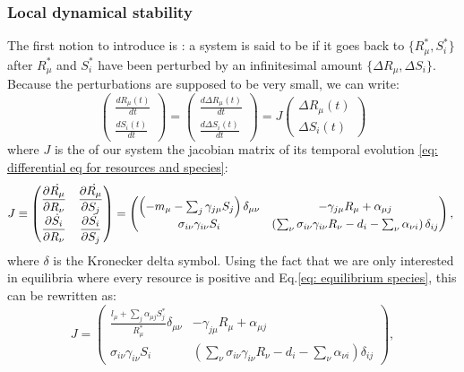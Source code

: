 \documentclass[12pt, titlepage]{report}
\begin{document}
\subsubsection{Local dynamical stability}
The first notion to introduce is : a system is said to be  if it goes back to  $\{ R^*_\mu, S^*_i \} $ after $R^*_\mu$ and $S^*_i$ have been perturbed by an infinitesimal amount $\{ \Delta R_\mu, \Delta S_i \}$.
Because the perturbations are supposed to be very small, we can write:
\begin{equation}
\begin{pmatrix}
\frac{dR_\mu(t)}{dt} \\
\frac{dS_i(t)}{dt}
\end{pmatrix}
=
\begin{pmatrix}
\frac{d\Delta R_\mu(t)}{dt} \\
\frac{d\Delta S_i(t)}{dt}
\end{pmatrix}
=
J
\begin{pmatrix}
\Delta R_\mu(t) \\
\Delta S_i(t)
\end{pmatrix}
\end{equation}
where $J$ is the  of our system \ie the jacobian matrix of its temporal evolution \eqref{eq: differential eq for resources and species}:
\begin{equation}
  J \defined
\begin{pmatrix}
  \partiald{\dot{R_\mu}}{R_\nu}& \partiald{\dot{R_\mu}}{S_j} \\
  \partiald{\dot{S_i}}{R_\nu} & \partiald{\dot{S_i}}{S_j}
\end{pmatrix}
=
\begin{pmatrix}
  \left(-m_\mu-\sum_j \gamma_{j\mu}S_j\right)\delta_{\mu\nu} & -\gamma_{j\mu}R_\mu+\alpha_{\mu j} \\
  \sigma_{i\nu}\gamma_{i\nu}S_i &\left(\sum_{\nu} \sigma_{i\nu}\gamma_{i\nu}R_\nu-d_i-\sum_\nu \alpha_{\nu i}\right)\delta_{ij}
\end{pmatrix}, \label{eq: definition of jacobian}
\end{equation}
where $\delta$ is the Kronecker delta symbol. Using the fact that we are only interested in equilibria where every resource is positive and Eq.\eqref{eq: equilibrium species}, this can be rewritten as:
\begin{equation}
 J = \begin{pmatrix}
   \frac{l_\mu + \sum_j \alpha_{\mu j}S_j^*}{R^*_\mu}\delta_{\mu\nu} & -\gamma_{j\mu}R_\mu+\alpha_{\mu j} \\
   \sigma_{i\nu}\gamma_{i\nu}S_i &\left(\sum_{\nu} \sigma_{i\nu}\gamma_{i\nu}R_\nu-d_i-\sum_\nu \alpha_{\nu i}\right)\delta_{ij}
 \end{pmatrix}, \label{eq: definition of jacobian alternative}
\end{equation}
\end{document}
